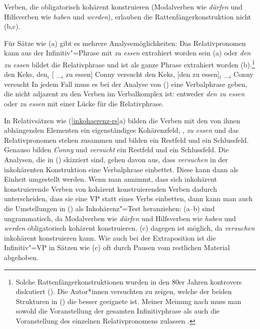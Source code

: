 Verben, die obligatorisch kohärent konstruieren (Modalverben wie \emph{dürfen} und Hilfsverben wie
\emph{haben} und \emph{werden}), erlauben die Rattenfängerkonstruktion nicht (b,c). 

Für Sätze wie (a) gibt es mehrere Analysemöglichkeiten: Das Relativpronomen kann aus der
Infinitiv"=Phrase mit \emph{zu essen} extrahiert worden sein (a)
oder \emph{den zu essen} bildet die Relativphrase und ist als ganze Phrase extrahiert 
worden (b).\footnote{
  Solche Rattenfängerkonstruktionen wurden in den 80er Jahren kontrovers diskutiert
  (\citealp*{Riemsdijk85,Haider85c,Grewendorf86,Trissler88,Riemsdijk94}). Die Autor*innen
  versuchten zu zeigen, welche der beiden Strukturen in () die besser geeignete ist.
  Meiner Meinung nach muss man sowohl die Voranstellung der gesamten Infinitivphrase
  als auch die Voranstellung des einzelnen Relativpronomens zulassen \citep[Abschnitt~10.7]{Mueller99a}.
}
\eal
\ex den Keks, den$_i$ [ \_$_i$ zu essen] Conny versucht
\ex den Keks, [den zu essen]$_i$ \_$_i$ Conny versucht
\zl
In jedem Fall muss es bei der Analyse von () eine Verbalphrase
geben, die nicht adjazent zu den Verben im Verbalkomplex ist: entweder \emph{den zu essen} oder
\emph{zu essen} mit einer Lücke für die Relativphrase.

In Relativsätzen wie (\ref{inkohaerenz-rs}a) bilden die Verben mit den von ihnen abhängenden Elementen ein
eigenständiges Kohärenzfeld, \dash, \emph{zu essen} und das Relativpronomen stehen zusammen
und bilden ein Restfeld und ein Schlussfeld. Genauso bilden \emph{Conny} und \emph{versucht} ein
Restfeld und ein Schlussfeld. Die Analysen, die in () skizziert sind, gehen davon aus, dass
\emph{versuchen} in der inkohärenten Konstruktion eine Verbalphrase einbettet. Diese kann dann als
Einheit umgestellt werden. Wenn man annimmt, dass sich inkohärent konstruierende Verben von
kohärent konstruierenden Verben dadurch unterscheiden, dass sie eine VP statt eines Verbs einbetten, dann kann man
auch die Umstellungen in () als Inkohärenz"=Test heranziehen:
(a--b) sind ungrammatisch, da Modalverben wie \emph{dürfen} und Hilfsverben wie
\emph{haben} und \emph{werden} obligatorisch kohärent konstruieren. 
(c) dagegen ist möglich, da \emph{versuchen} inkohärent konstruieren kann.
\largerpage
\eal
{}
\zl
Wie auch bei der Extraposition ist die Infinitiv"=VP in Sätzen wie (c) oft
durch Pausen vom restlichen Material abgehoben.%

